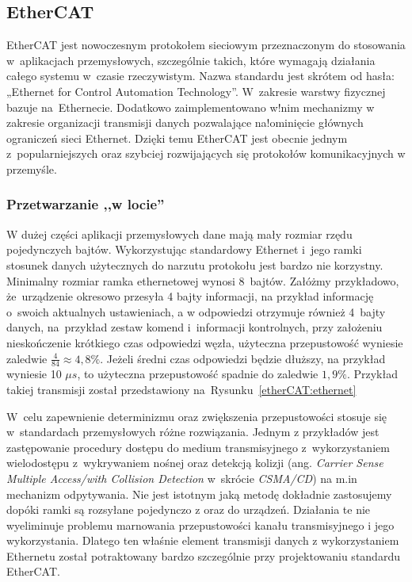 \subsection{EtherCAT}

EtherCAT jest nowoczesnym protokołem sieciowym przeznaczonym do stosowania w~aplikacjach przemysłowych, szczególnie takich, które wymagają działania całego systemu w~czasie rzeczywistym. Nazwa standardu jest skrótem od hasła: „Ethernet for Control Automation Technology”. W~zakresie warstwy fizycznej bazuje na~Ethernecie. Dodatkowo zaimplementowano w!nim mechanizmy w zakresie organizacji transmisji danych pozwalające na!ominięcie głównych ograniczeń sieci Ethernet. Dzięki temu EtherCAT jest obecnie jednym z~popularniejszych oraz szybciej rozwijających się protokołów komunikacyjnych w przemyśle.

\subsubsection{Przetwarzanie ,,w locie''}
W dużej części aplikacji przemysłowych dane mają mały rozmiar rzędu pojedynczych bajtów. Wykorzystując standardowy Ethernet i~jego ramki stosunek danych użytecznych do narzutu protokołu jest bardzo nie korzystny. 
Minimalny rozmiar ramka ethernetowej wynosi 8~bajtów. Załóżmy przykładowo, że~urządzenie okresowo przesyła 4 bajty informacji, na przykład informację o~swoich aktualnych ustawieniach, a w odpowiedzi otrzymuje również 4~bajty danych, na~przykład zestaw komend i~informacji kontrolnych, przy założeniu nieskończenie krótkiego czas odpowiedzi węzła, użyteczna przepustowość wyniesie zaledwie $\frac{4}{84}\approx4,8\%$. Jeżeli średni czas odpowiedzi będzie dłuższy, na przykład wyniesie 10 $\mu s$, to użyteczna przepustowość spadnie do zaledwie $1,9\%$. Przykład takiej transmisji został przedstawiony na~Rysunku~\ref{etherCAT:ethernet}


W~celu zapewnienie determinizmu oraz zwiększenia przepustowości stosuje się w~standardach przemysłowych różne rozwiązania. Jednym z przykładów jest zastępowanie procedury dostępu do medium transmisyjnego z~wykorzystaniem wielodostępu z~wykrywaniem nośnej oraz detekcją kolizji (ang. \textit{Carrier Sense Multiple Access/with Collision Detection} w~skrócie \textit{CSMA/CD}) na m.in mechanizm odpytywania.
Nie jest istotnym jaką metodę dokładnie zastosujemy dopóki ramki są rozsyłane pojedynczo z oraz do urządzeń. Działania te nie wyeliminuje problemu marnowania przepustowości kanału transmisyjnego i jego wykorzystania. Dlatego ten właśnie element transmisji danych z wykorzystaniem Ethernetu został potraktowany bardzo szczególnie przy projektowaniu standardu EtherCAT.

